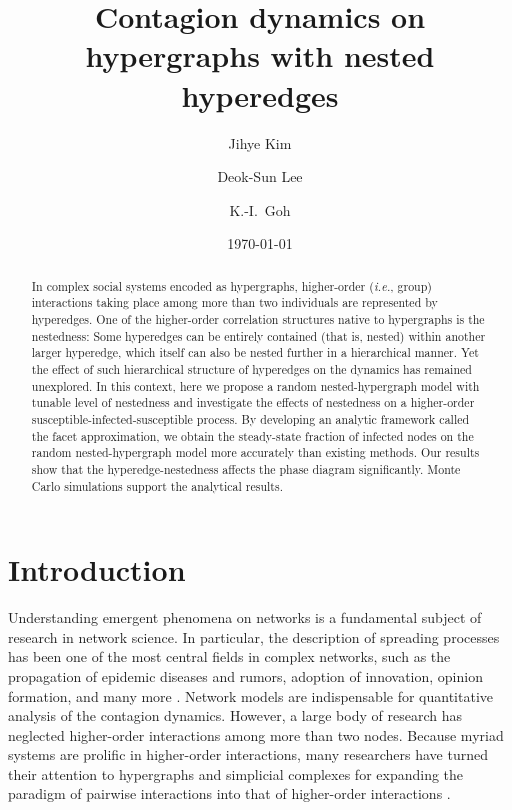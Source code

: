 \documentclass[aps,pre,twocolumn,nofootinbib,superscriptaddress,showpacs,showkeys]{revtex4-1}
\begin{document}

\setcounter{page}{1}
\title{Contagion dynamics on hypergraphs with nested hyperedges}
\author{Jihye Kim}
\author{Deok-Sun Lee}
\author{K.-I.~Goh}
\date{\today}
\begin{abstract}
In complex social systems encoded as hypergraphs, higher-order ({\it i.e.}, group) interactions taking place among more than two individuals are represented by hyperedges.
One of the higher-order correlation structures native to hypergraphs is the nestedness: Some hyperedges can be entirely contained (that is, nested) within another larger hyperedge, which itself can also be nested further in a hierarchical manner. Yet the effect of such hierarchical structure of hyperedges on the dynamics has remained unexplored. 
In this context, here we propose a random nested-hypergraph model with tunable level of nestedness and investigate the effects of nestedness on a  higher-order susceptible-infected-susceptible process. 
By developing an analytic framework called the facet approximation, 
we obtain the steady-state fraction of infected nodes on the random nested-hypergraph model more accurately than existing methods.
Our results show that the hyperedge-nestedness affects the phase diagram significantly. Monte Carlo simulations support the analytical results. 
\end{abstract}
\maketitle
\section{\label{sec:level1}Introduction}
Understanding emergent phenomena \cite{r1} on networks is a fundamental subject of research in network science. In particular, the description of spreading processes has been one of the most central fields in complex networks, such as the propagation of epidemic diseases \cite{r2} and rumors, adoption of innovation, opinion formation, and many more \cite{newman1,goh}. Network models are  indispensable for quantitative analysis of the contagion dynamics. However, a large body of research has neglected higher-order interactions among more than two nodes. Because myriad systems \cite{bioche,sim_col2,eco1,eco2,trade} are prolific in higher-order interactions, many researchers have turned their attention to hypergraphs and simplicial complexes for expanding the paradigm of pairwise interactions into that of higher-order interactions \cite{physicsreport,blue,bianconi2021,pink}. 
\end{document}
